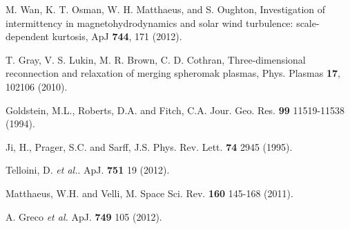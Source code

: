 \documentclass[aip,prl,amsmath,amssymb,reprint,superscriptaddress]{revtex4-1} %
\begin{document}
\begin{thebibliography}{21}
M. Wan, K. T. Osman, W. H. Matthaeus, and S. Oughton, Investigation of intermittency in magnetohydrodynamics and solar wind turbulence: scale-dependent kurtosis, ApJ {\bf 744}, 171 (2012).


T. Gray, V. S. Lukin, M. R. Brown, C. D. Cothran, Three-dimensional reconnection and relaxation of merging spheromak plasmas, Phys. Plasmas {\bf 17}, 102106 (2010).



Goldstein, M.L., Roberts, D.A. and Fitch, C.A. Jour. Geo. Res. {\bf 99} 11519-11538 (1994).

Ji, H., Prager, S.C. and Sarff, J.S. Phys. Rev. Lett. {\bf 74} 2945 (1995).

Telloini, D. {\it et al.}. ApJ. {\bf 751} 19 (2012).

Matthaeus, W.H. and Velli, M. Space Sci. Rev. {\bf 160} 145-168 (2011).

A. Greco {\it et al.} ApJ. {\bf 749} 105 (2012).

\end{thebibliography}
\end{document}
